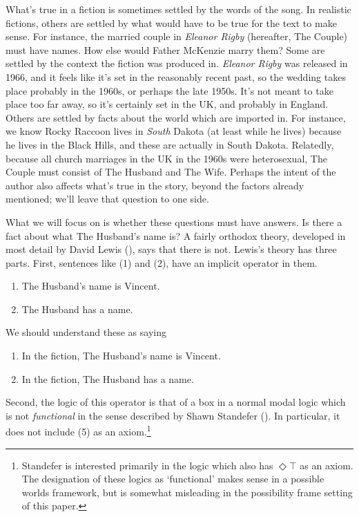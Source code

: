 \documentclass[
  11pt,
  letterpaper,
  DIV=11,
  numbers=noendperiod,
  twoside]{scrartcl}
\providecommand{\tightlist}{%
  \setlength{\itemsep}{0pt}\setlength{\parskip}{0pt}}
\begin{document}
What's true in a fiction is sometimes settled by the words of the song.
In realistic fictions, others are settled by what would have to be true
for the text to make sense. For instance, the married couple in
\emph{Eleanor Rigby} (hereafter, The Couple) must have names. How else
would Father McKenzie marry them? Some are settled by the context the
fiction was produced in. \emph{Eleanor Rigby} was released in 1966, and
it feels like it's set in the reasonably recent past, so the wedding
takes place probably in the 1960s, or perhaps the late 1950s. It's not
meant to take place too far away, so it's certainly set in the UK, and
probably in England. Others are settled by facts about the world which
are imported in. For instance, we know Rocky Raccoon lives in
\emph{South} Dakota (at least while he lives) because he lives in the
Black Hills, and these are actually in South Dakota. Relatedly, because
all church marriages in the UK in the 1960s were heterosexual, The
Couple must consist of The Husband and The Wife. Perhaps the intent of
the author also affects what's true in the story, beyond the factors
already mentioned; we'll leave that question to one side.

What we will focus on is whether these questions must have answers. Is
there a fact about what The Husband's name is? A fairly orthodox theory,
developed in most detail by David Lewis
(), says that there is not. Lewis's
theory has three parts. First, sentences like (1) and (2), have an
implicit operator in them.

\begin{enumerate}
\def\labelenumi{(\arabic{enumi})}
\tightlist
\item
  The Husband's name is Vincent.
\item
  The Husband has a name.
\end{enumerate}

We should understand these as saying

\begin{enumerate}
\def\labelenumi{(\arabic{enumi})}
\setcounter{enumi}{2}
\tightlist
\item
  In the fiction, The Husband's name is Vincent.
\item
  In the fiction, The Husband has a name.
\end{enumerate}

Second, the logic of this operator is that of a box in a normal modal
logic which is not \emph{functional} in the sense described by Shawn
Standefer (). In particular, it does
not include (5) as an axiom.\footnote{Standefer is interested primarily
  in the logic which also has \(\Diamond \top\) as an axiom. The
  designation of these logics as `functional' makes sense in a possible
  worlds framework, but is somewhat misleading in the possibility frame
  setting of this paper.}
\end{document}
